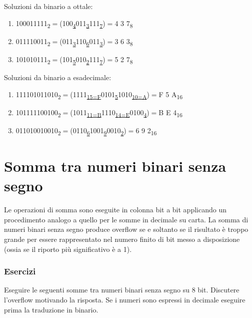 \documentclass{article}
\begin{document}
Soluzioni da binario a ottale:
\begin{enumerate}

    \item 100011111\textsubscript{2}$=$(100\textsubscript{\underline{4}}011\textsubscript{\underline{3}}111\textsubscript{\underline{7}})$=$4 3 7\textsubscript{8}
    \item 011110011\textsubscript{2}$=$(011\textsubscript{\underline{3}}110\textsubscript{\underline{6}}011\textsubscript{\underline{3}})$=$3 6 3\textsubscript{8}
    \item 101010111\textsubscript{2}$=$(101\textsubscript{\underline{5}}010\textsubscript{\underline{2}}111\textsubscript{\underline{7}})$=$5 2 7\textsubscript{8}
\end{enumerate}
Soluzioni da binario a esadecimale:
\begin{enumerate}

    \item 111101011010\textsubscript{2}$=$(1111\textsubscript{\underline{15=F}}0101\textsubscript{\underline{5}}1010\textsubscript{\underline{10=A}})$=$F 5 A\textsubscript{16}
    \item 101111100100\textsubscript{2}$=$(1011\textsubscript{\underline{11=B}}1110\textsubscript{\underline{14=E}}0100\textsubscript{\underline{4}})$=$B E 4\textsubscript{16}
    \item 011010010010\textsubscript{2}$=$(0110\textsubscript{\underline{6}}1001\textsubscript{\underline{9}}0010\textsubscript{\underline{2}})$=$6 9 2\textsubscript{16}
\end{enumerate}

\section{Somma tra numeri binari senza segno}

Le operazioni di somma sono eseguite in colonna bit a bit applicando un procedimento analogo a quello per le somme in decimale su carta.
La somma di numeri binari senza segno produce overflow se e soltanto se il risultato \`e troppo grande per essere rappresentato nel numero finito di bit messo a disposizione (ossia se il riporto pi\`u significativo \`e a 1).

\subsubsection*{Esercizi}
Eseguire le seguenti somme tra numeri binari senza segno su 8 bit. Discutere l'overflow motivando la risposta. Se i numeri sono espressi in decimale eseguire prima la traduzione in binario.
\end{document}
